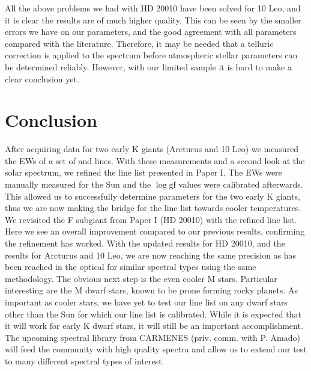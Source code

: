 \documentclass{aa}
\begin{document}
All the above problems we had with HD 20010 have been solved for 10 Leo, and it
is clear the results are of much higher quality. This can be seen by the smaller
errors we have on our parameters, and the good agreement with all parameters
compared with the literature. Therefore, it may be needed that a telluric
correction is applied to the spectrum before atmospheric stellar parameters can
be determined reliably. However, with our limited sample it is hard to make a
clear conclusion yet.



\section{Conclusion}
\label{sec:conclusion}

After acquiring data for two early K giants (Arcturus and 10 Leo) we measured
the EWs of a set of  and  lines. With these measurements
and a second look at the solar spectrum, we refined the line list presented in
Paper I. The EWs were manually measured for the Sun and the $\log \mathrm{gf}$
values were calibrated afterwards. This allowed us to successfully determine
parameters for the two early K giants, thus we are now making the bridge for the
line list towards cooler temperatures. We revisited the F subgiant from Paper I
(HD 20010) with the refined line list. Here we see an overall improvement
compared to our previous results, confirming the refinement has worked. With the
updated results for HD 20010, and the results for Arcturus and 10 Leo, we are
now reaching the same precision as has been reached in the optical for similar
spectral types using the same methodology. The obvious next step is the even
cooler M stars. Particular interesting are the M dwarf stars, known to be prone
forming rocky planets. As important as cooler stars, we have yet to test our
line list on any dwarf stars other than the Sun for which our line list is
calibrated. While it is expected that it will work for early K dwarf stars, it
will still be an important accomplishment. The upcoming spectral library from
CARMENES (priv. comm. with P. Amado) will feed the community with high quality
spectra and allow us to extend our test to many different spectral types of
interest.
\end{document}
